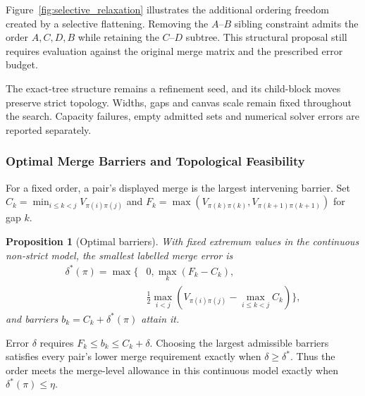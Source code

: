 \documentclass[review]{vgtc}
\newtheorem{proposition}{Proposition}
\begin{document}
Figure~\ref{fig:selective_relaxation} illustrates the additional ordering freedom created by a selective flattening. Removing the $A$--$B$ sibling constraint admits the order $A,C,D,B$ while retaining the $C$--$D$ subtree. This structural proposal still requires evaluation against the original merge matrix and the prescribed error budget.

The exact-tree structure remains a refinement seed, and its child-block moves preserve strict topology. Widths, gaps and canvas scale remain fixed throughout the search. Capacity failures, empty admitted sets and numerical solver errors are reported separately.

\subsubsection{Optimal Merge Barriers and Topological Feasibility}
For a fixed order, a pair's displayed merge is the largest intervening barrier. Set $C_k=\min_{i\le k<j}V_{\pi(i)\pi(j)}$ and $F_k=\max(V_{\pi(k)\pi(k)},V_{\pi(k+1)\pi(k+1)})$ for gap $k$.
\begin{proposition}[Optimal barriers]\label{prop:barriers}
With fixed extremum values in the continuous non-strict model, the smallest labelled merge error is
\begin{equation}\label{eq:delta}
\begin{split}
 \delta^*(\pi)=\max\bigg\{&0,\max_k(F_k-C_k),\\
 &\frac12\max_{i<j}\left(V_{\pi(i)\pi(j)}-
                         \max_{i\le k<j}C_k\right)\bigg\},
\end{split}
\end{equation}
and barriers $b_k=C_k+\delta^*(\pi)$ attain it.
\end{proposition}
Error $\delta$ requires $F_k\le b_k\le C_k+\delta$. Choosing the largest admissible barriers satisfies every pair's lower merge requirement exactly when $\delta\ge\delta^*$. Thus the order meets the merge-level allowance in this continuous model exactly when $\delta^*(\pi)\le\eta$. 
\end{document}
